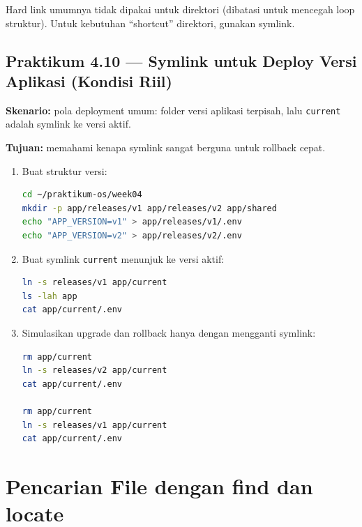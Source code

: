 \begin{warningbox}
Hard link umumnya tidak dipakai untuk direktori (dibatasi untuk mencegah loop struktur).
Untuk kebutuhan ``shortcut'' direktori, gunakan symlink.
\end{warningbox}

\subsection*{Praktikum 4.10 --- Symlink untuk Deploy Versi Aplikasi (Kondisi Riil)}
\textbf{Skenario:} pola deployment umum: folder versi aplikasi terpisah, lalu \texttt{current} adalah symlink ke versi aktif.

\textbf{Tujuan:} memahami kenapa symlink sangat berguna untuk rollback cepat.

\begin{enumerate}
    \item Buat struktur versi:
\begin{lstlisting}[language=bash, caption={Membuat versi aplikasi palsu}]
cd ~/praktikum-os/week04
mkdir -p app/releases/v1 app/releases/v2 app/shared
echo "APP_VERSION=v1" > app/releases/v1/.env
echo "APP_VERSION=v2" > app/releases/v2/.env
\end{lstlisting}

    \item Buat symlink \texttt{current} menunjuk ke versi aktif:
\begin{lstlisting}[language=bash, caption={Membuat symlink current}]
ln -s releases/v1 app/current
ls -lah app
cat app/current/.env
\end{lstlisting}

    \item Simulasikan upgrade dan rollback hanya dengan mengganti symlink:
\begin{lstlisting}[language=bash, caption={Switch versi via symlink}]
rm app/current
ln -s releases/v2 app/current
cat app/current/.env

rm app/current
ln -s releases/v1 app/current
cat app/current/.env
\end{lstlisting}
\end{enumerate}

\section{Pencarian File dengan find dan locate}
\label{sec:search}

